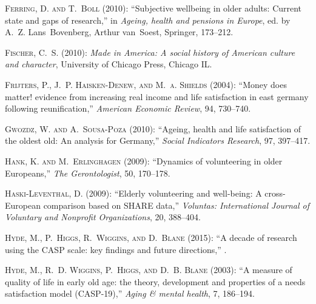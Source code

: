 \documentclass[10pt, letterpaper]{article}
\begin{document}
\begin{spacing}{1.4}
\begin{thebibliography}{91}
\textsc{Ferring, D. and T.~Boll} (2010): \enquote{Subjective wellbeing in older
  adults: Current state and gaps of research,} in \emph{Ageing, health and
  pensions in Europe}, ed. by A.~Z. Lans~Bovenberg, Arthur van~Soest, Springer,
  173--212.

\textsc{Fischer, C.~S.} (2010): \emph{Made in America: A social history of
  American culture and character}, University of Chicago Press, Chicago IL.

\textsc{Frijters, P., J.~P. Haisken-Denew, and M.~a. Shields} (2004):
  \enquote{{Money does matter! evidence from increasing real income and life
  satisfaction in east germany following reunification},} \emph{American
  Economic Review}, 94, 730--740.

\textsc{Gwozdz, W. and A.~Sousa-Poza} (2010): \enquote{Ageing, health and life
  satisfaction of the oldest old: An analysis for Germany,} \emph{Social
  Indicators Research}, 97, 397--417.

\textsc{Hank, K. and M.~Erlinghagen} (2009): \enquote{Dynamics of volunteering
  in older Europeans,} \emph{The Gerontologist}, 50, 170--178.

\textsc{Haski-Leventhal, D.} (2009): \enquote{Elderly volunteering and
  well-being: A cross-European comparison based on SHARE data,} \emph{Voluntas:
  International Journal of Voluntary and Nonprofit Organizations}, 20,
  388--404.

\textsc{Hyde, M., P.~Higgs, R.~Wiggins, and D.~Blane} (2015): \enquote{A decade
  of research using the CASP scale: key findings and future directions,} .

\textsc{Hyde, M., R.~D. Wiggins, P.~Higgs, and D.~B. Blane}
  (2003{}): \enquote{A measure of quality of life in early old age:
  the theory, development and properties of a needs satisfaction model
  (CASP-19),} \emph{Aging \& mental health}, 7, 186--194.


\end{thebibliography}
\end{spacing}
\end{document}
